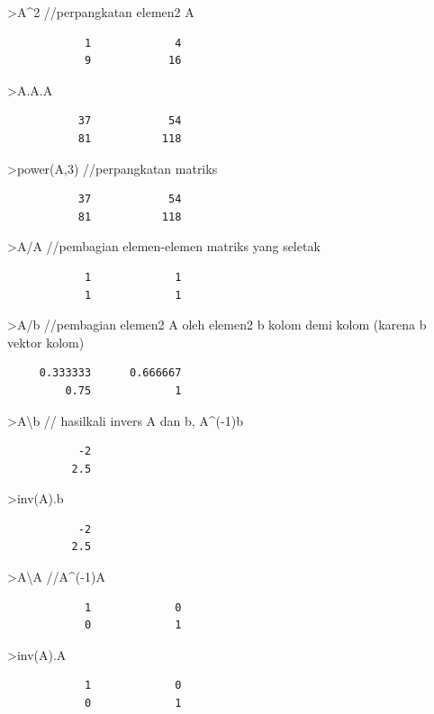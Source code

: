 \documentclass[
]{book}
\begin{document}
\textgreater A\^{}2 //perpangkatan elemen2 A

\begin{verbatim}
            1             4 
            9            16 
\end{verbatim}

\textgreater A.A.A

\begin{verbatim}
           37            54 
           81           118 
\end{verbatim}

\textgreater power(A,3) //perpangkatan matriks

\begin{verbatim}
           37            54 
           81           118 
\end{verbatim}

\textgreater A/A //pembagian elemen-elemen matriks yang seletak

\begin{verbatim}
            1             1 
            1             1 
\end{verbatim}

\textgreater A/b //pembagian elemen2 A oleh elemen2 b kolom demi kolom (karena b vektor kolom)

\begin{verbatim}
     0.333333      0.666667 
         0.75             1 
\end{verbatim}

\textgreater A\textbackslash b // hasilkali invers A dan b, A\^{}(-1)b

\begin{verbatim}
           -2 
          2.5 
\end{verbatim}

\textgreater inv(A).b

\begin{verbatim}
           -2 
          2.5 
\end{verbatim}

\textgreater A\textbackslash A //A\^{}(-1)A

\begin{verbatim}
            1             0 
            0             1 
\end{verbatim}

\textgreater inv(A).A

\begin{verbatim}
            1             0 
            0             1 
\end{verbatim}
\end{document}
